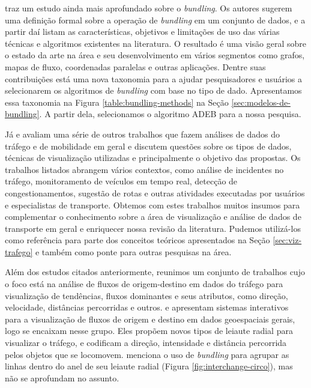   \citet{Lhuillier2017} traz um estudo ainda mais aprofundado sobre o
\emph{bundling}. Os autores sugerem uma definição formal sobre a operação de
\emph{bundling} em um conjunto de dados, e a partir daí listam as
características, objetivos e limitações de uso das várias técnicas e algoritmos
existentes na literatura. O resultado é uma visão geral sobre o estado da arte
na área e seu desenvolvimento em vários segmentos como grafos, mapas de fluxo,
coordenadas paralelas e outras aplicações. Dentre suas contribuições está uma
nova taxonomia para a ajudar pesquisadores e usuários a selecionarem os
algoritmos de \emph{bundling} com base no tipo de dado.  Apresentamos essa
taxonomia na Figura \ref{table:bundling-methods} na Seção
\ref{sec:modelos-de-bundling}. A partir dela, selecionamos o algoritmo ADEB
para a nossa pesquisa.

  Já \citet{Andrienko2017Visual} e \citet{Chen2015} avaliam uma série de outros
trabalhos que fazem análises de dados do tráfego e de mobilidade em geral e
discutem questões sobre os tipos de dados, técnicas de visualização utilizadas
e principalmente o objetivo das propostas. Os trabalhos listados abrangem
vários contextos, como análise de incidentes no tráfego, monitoramento de
veículos em tempo real, detecção de congestionamentos, sugestão de rotas e
outras atividades executadas por usuários e especialistas de transporte.
Obtemos com estes trabalhos muitos insumos para complementar o conhecimento
sobre a área de visualização e análise de dados de transporte em geral e
enriquecer nossa revisão da literatura. Pudemos utilizá-los como referência
para parte dos conceitos teóricos apresentados na Seção \ref{sec:viz-trafego} e
também como ponte para outras pesquisas na área.

  Além dos estudos citados anteriormente, reunimos um conjunto de trabalhos
cujo o foco está na análise de fluxos de origem-destino em dados do tráfego
para visualização de tendências, fluxos dominantes e seus atributos, como
direção, velocidade, distâncias percorridas e outros.  \citet{Zeng2013} e
\citet{Andrienko2017}  apresentam sistemas interativos para a visualização de
fluxos de origem e destino em dados geoespaciais gerais, logo se encaixam nesse
grupo. Eles propõem novos tipos de leiaute radial para visualizar o tráfego, e
codificam a direção, intensidade e distância percorrida pelos objetos que se
locomovem. \citet{Zeng2013} menciona o uso de \emph{bundling} para agrupar as
linhas dentro do anel de seu leiaute radial (Figura
\ref{fig:interchange-circo}), mas não se aprofundam no assunto.

